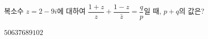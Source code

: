 복소수 $z=2-9i$에 대하여 $\dfrac{1+z}{z}+\dfrac{1-z}{\bar{z}}=\dfrac{q}{p}$일 때, $p+q$의 값은? 
\begin{choices32}{$50$}{$63$}{$76$}{$89$}{$102$}\end{choices32}
